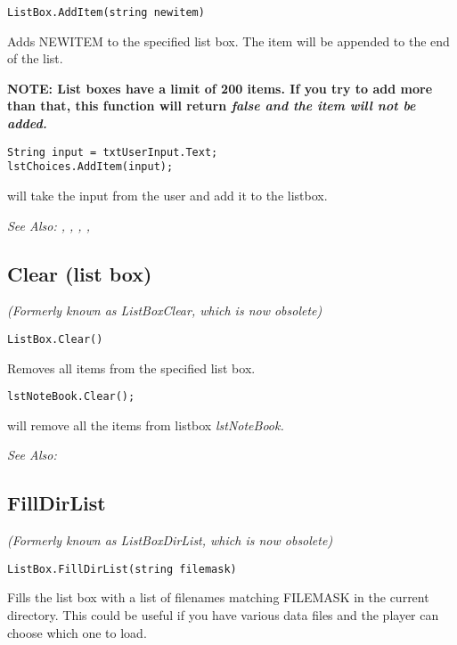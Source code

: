 \begin{verbatim}
ListBox.AddItem(string newitem)
\end{verbatim}
Adds NEWITEM to the specified list box. The item will be appended to
the end of the list.

\bf{NOTE:} List boxes have a limit of 200 items. If you try to add more than that,
this function will return \it{false} and the item will not be added.

\begin{verbatim}
String input = txtUserInput.Text;
lstChoices.AddItem(input);
\end{verbatim}
will take the input from the user and add it to the listbox.

\it{See Also:} ,
,
,
,


\subsection{Clear (list box)}\label{ListBox.Clear}%

\it{(Formerly known as ListBoxClear, which is now obsolete)}

\begin{verbatim}
ListBox.Clear()
\end{verbatim}
Removes all items from the specified list box.

\begin{verbatim}
lstNoteBook.Clear();
\end{verbatim}
will remove all the items from listbox \it{lstNoteBook}.

\it{See Also:} 


\subsection{FillDirList}\label{ListBox.FillDirList}%

\it{(Formerly known as ListBoxDirList, which is now obsolete)}

\begin{verbatim}
ListBox.FillDirList(string filemask)
\end{verbatim}
Fills the list box with a list of filenames matching FILEMASK in
the current directory. This could be useful if you have various
data files and the player can choose which one to load.

